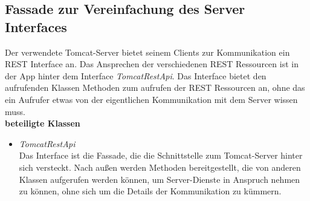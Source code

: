 \documentclass[parskip=full]{scrartcl}
\begin{document}
\subsection{Fassade zur Vereinfachung des Server Interfaces}
Der verwendete Tomcat-Server bietet seinem Clients zur Kommunikation ein REST Interface an. Das Ansprechen der verschiedenen REST Ressourcen ist in der App hinter dem Interface \textit{TomcatRestApi}. Das Interface bietet den aufrufenden Klassen Methoden zum aufrufen der REST Ressourcen an, ohne das ein Aufrufer etwas von der eigentlichen Kommunikation mit dem Server wissen muss. \\

\textbf{beteiligte Klassen}
\begin{itemize}
	\item \textit{TomcatRestApi} \\
	Das Interface ist die Fassade, die die Schnittstelle zum Tomcat-Server hinter sich versteckt. Nach außen werden Methoden bereitgestellt, die von anderen Klassen aufgerufen werden können, um Server-Dienste in Anspruch nehmen zu können, ohne sich um die Details der Kommunikation zu kümmern.
\end{itemize}
\end{document}
